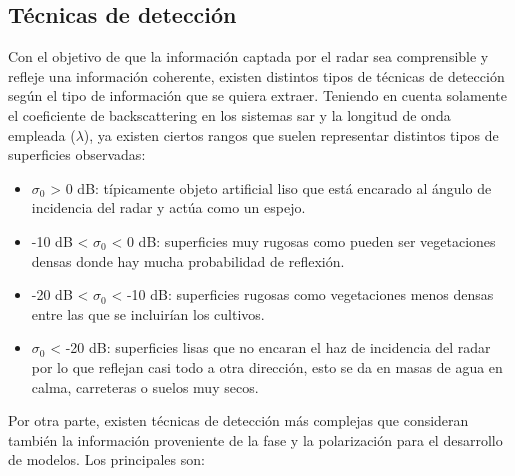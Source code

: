 \subsection{Técnicas de detección}
\par Con el objetivo de que la información captada por el radar sea comprensible y refleje una información coherente, existen distintos tipos de técnicas de detección según el tipo de información que se quiera extraer. Teniendo en cuenta solamente el coeficiente de backscattering en los sistemas \gls{sar} y la longitud de onda empleada ($\lambda$), ya existen ciertos rangos que suelen representar distintos tipos de superficies observadas:
\begin{itemize}
	\item $\sigma_{0}$ > 0 dB: típicamente objeto artificial liso que está encarado al ángulo de incidencia del radar y actúa como un espejo.
	\item -10 dB < $\sigma_{0}$ < 0 dB: superficies muy rugosas como pueden ser vegetaciones densas donde hay mucha probabilidad de reflexión.
	\item -20 dB < $\sigma_{0}$ < -10 dB: superficies rugosas como vegetaciones menos densas entre las que se incluirían los cultivos. 
	\item $\sigma_{0}$ < -20 dB: superficies lisas que no encaran el haz de incidencia del radar por lo que reflejan casi todo a otra dirección, esto se da en masas de agua en calma, carreteras o suelos muy secos. 
\end{itemize}
\par Por otra parte, existen técnicas de detección más complejas que consideran también la información proveniente de la fase y la polarización para el desarrollo de modelos. Los principales son:
